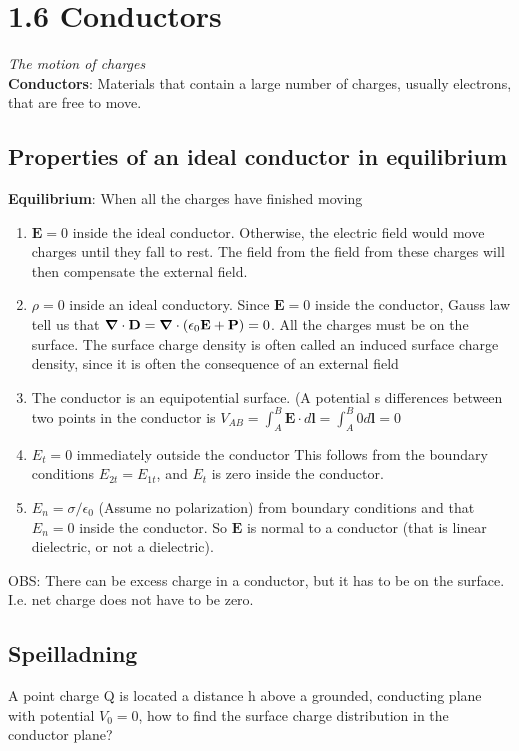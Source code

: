 \documentclass[
12pt, reprint, aip, onecolumn, notitlepage
]{revtex4-1}
\begin{document}
\section{1.6 Conductors}

\textit{The motion of charges}\\

\textbf{Conductors}: Materials that contain a large number of charges, usually electrons, that are free to move. 

\subsection*{Properties of an ideal conductor in equilibrium}
\textbf{Equilibrium}: When all the charges have finished moving

\begin{enumerate}
	\item $\mathbf{E} = 0$ inside the ideal conductor. Otherwise, the electric field would move charges until they fall to rest. The field from the field from these charges will then compensate the external field.
	\item $\rho = 0$ inside an ideal conductory. Since $\mathbf{E} = 0$ inside the conductor, Gauss law tell us that $\grad{\cdot\mathbf{D}} = \grad{\cdot(\epsilon_0\mathbf{E} + \mathbf{P})} = 0$. All the charges must be on the surface. The surface charge density is often called an induced surface charge density, since it is often the consequence of an external field
	\item The conductor is an equipotential surface. (A potential s differences between two points in the conductor is $V_{AB} = \int_{A}^{B}\mathbf{E}\cdot d\mathbf{l} = \int_{A}^{B}0d\mathbf{l} = 0$
	\item $E_t = 0$ immediately outside the conductor This follows from the boundary conditions $E_{2t} = E_{1t}$, and $E_{t}$ is zero inside the conductor.
	\item $E_n = \sigma/\epsilon_0$ (Assume no polarization) from boundary conditions and that $E_n = 0$ inside the conductor. So $\mathbf{E}$ is normal to a conductor (that is linear dielectric, or not a dielectric). 
\end{enumerate}
OBS: There can be excess charge in a conductor, but it has to be on the surface. I.e. net charge does not have to be zero. 


\subsection{Speilladning}
A point charge Q is located a distance h above a grounded, conducting plane with potential $V_0 = 0$, how to find the surface charge distribution in the conductor plane? 
\end{document}
